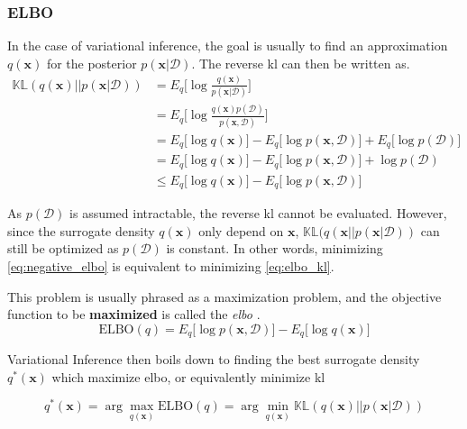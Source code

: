 \subsubsection{ELBO}
In the case of variational inference, the goal is usually to find an approximation $q(\mathbf{x})$ for the posterior $p(\mathbf{x} | \mathcal{D})$. The reverse \acrshort{kl} can then be written as.
\begin{subequations}
\begin{align}
    \mathbb{KL}(q(\mathbf{x}) || p(\mathbf{x} | \mathcal{D})) &= E_q\big[\log \frac{q(\mathbf{x})}{p(\mathbf{x} | \mathcal{D})} \big]\label{eq:elbo_kl}\\
    &= E_q\big[\log \frac{q(\mathbf{x}) p(\mathcal{D})}{p(\mathbf{x}, \mathcal{D})} \big]\\
    &= E_q\big[\log q(\mathbf{x}) \big] - E_q\big[\log p(\mathbf{x}, \mathcal{D})] + E_q\big[\log p(\mathcal{D}) \big]\\
    &= E_q\big[\log q(\mathbf{x}) \big] - E_q\big[\log p(\mathbf{x}, \mathcal{D})] + \log p(\mathcal{D})\\
    &\leq E_q\big[\log q(\mathbf{x}) \big] - E_q\big[\log p(\mathbf{x}, \mathcal{D})]\label{eq:negative_elbo}
\end{align}
\end{subequations}

As $p(\mathcal{D})$ is assumed intractable, the reverse \acrshort{kl} cannot be evaluated. However, since the surrogate density $q(\mathbf{x})$ only depend on $\mathbf{x}$, $\mathbb{KL}(q(\mathbf{x} || p(\mathbf{x} | \mathcal{D}))$ can still be optimized as $p(\mathcal{D})$ is constant. In other words, minimizing \cref{eq:negative_elbo} is equivalent to minimizing \cref{eq:elbo_kl}.

This problem is usually phrased as a maximization problem, and the objective function to be \textbf{maximized} is called the \textit{\acrfull{elbo}} \cite{Blei_2017}.
\begin{equation}
    \text{ELBO}(q) = E_q\big[\log p(\mathbf{x}, \mathcal{D})] - E_q\big[\log q(\mathbf{x}) \big]
\end{equation}

Variational Inference then boils down to finding the best surrogate density $q^*(\mathbf{x})$ which maximize \acrshort{elbo}, or equivalently minimize \acrshort{kl} 

\begin{equation}
    q^*(\mathbf{x}) = \arg \max_{q(\mathbf{x})} \text{ELBO}(q) = \arg \min_{q(\mathbf{x})} \mathbb{KL}(q(\mathbf{x}) || p(\mathbf{x} | \mathcal{D}))
\end{equation}



